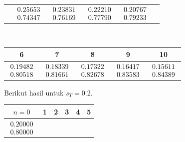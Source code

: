 \begin{exercises}
\begin{answer}
\begin{exparts}
\begin{center}
\begin{tabular}{c|ccccc}
               &$\begin{array}{c}  0.25653 \\ 0.74347 \end{array}$
               &$\begin{array}{c}  0.23831 \\ 0.76169 \end{array}$
               &$\begin{array}{c}  0.22210 \\ 0.77790 \end{array}$
               &$\begin{array}{c}  0.20767 \\ 0.79233 \end{array}$
             \end{tabular}                                     \\[1ex]
             \begin{tabular}{|ccccc}
               6  &7  &8  &9 &10 \\ 
               \hline
               $\begin{array}{c}  0.19482 \\ 0.80518 \end{array}$
               &$\begin{array}{c}  0.18339 \\ 0.81661 \end{array}$
               &$\begin{array}{c}  0.17322 \\ 0.82678 \end{array}$
               &$\begin{array}{c}  0.16417 \\ 0.83583 \end{array}$
               &$\begin{array}{c}  0.15611 \\ 0.84389 \end{array}$
             \end{tabular}
           \end{center}
         \partsitem Berikut hasil untuk $s_T=0.2$.
           \begin{center}
             \begin{tabular}{c|ccccc}
               $n=0$ &1  &2  &3  &4  &5  \\ 
               \hline
               $\begin{array}{c}  0.20000 \\ 0.80000 \end{array}$

\end{tabular}
\end{center}
\end{exparts}
\end{answer}
\end{exercises}
